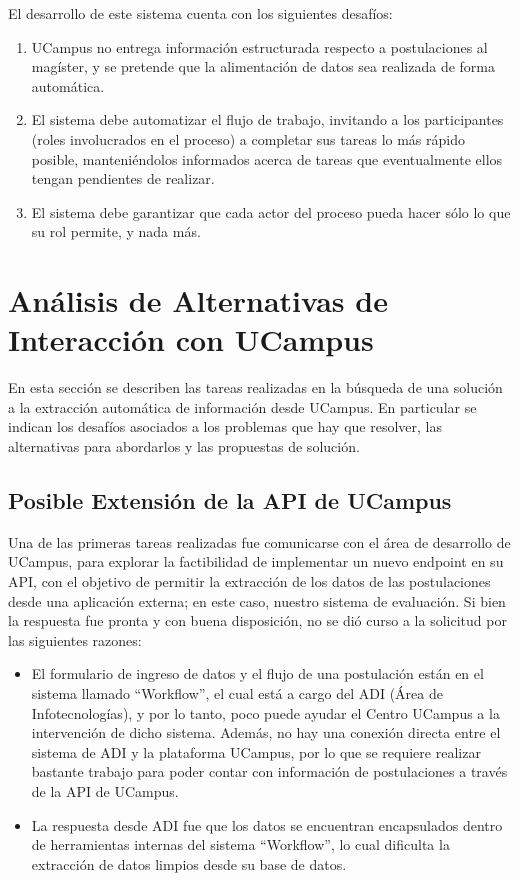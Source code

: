 El desarrollo de este sistema cuenta con los siguientes desafíos:

\begin{enumerate}
    \item UCampus no entrega información estructurada respecto a postulaciones
    al magíster, y se pretende que la alimentación de datos sea realizada de
    forma automática.
    \item El sistema debe automatizar el flujo de trabajo, invitando a los
    participantes (roles involucrados en el proceso) a completar sus tareas lo
    más rápido posible, manteniéndolos informados acerca de tareas que
    eventualmente ellos tengan pendientes de realizar.
    \item El sistema debe garantizar que cada actor del proceso pueda hacer sólo
    lo que su rol permite, y nada más.
\end{enumerate}


\section{Análisis de Alternativas de Interacción con UCampus}

En esta sección se describen las tareas realizadas en la búsqueda de una
solución a la extracción automática de información desde UCampus. En particular
se indican los desafíos asociados a los problemas que hay que resolver, las
alternativas para abordarlos y las propuestas de solución.

\subsection{Posible Extensión de la API de UCampus}

Una de las primeras tareas realizadas fue comunicarse con el área de desarrollo
de UCampus, para explorar la factibilidad de implementar un nuevo endpoint en su
API, con el objetivo de permitir la extracción de los datos de las postulaciones
desde una aplicación externa; en este caso, nuestro sistema de evaluación. Si
bien la respuesta fue pronta y con buena disposición, no se dió curso a la
solicitud por las siguientes razones:

\begin{itemize}
    \item El formulario de ingreso de datos y el flujo de una postulación están en
    el sistema llamado ``Workflow'', el cual está a cargo del ADI (Área de
    Infotecnologías), y por lo tanto, poco puede ayudar el Centro UCampus a la
    intervención de dicho sistema. Además, no hay una conexión directa entre el
    sistema de ADI y la plataforma UCampus, por lo que se requiere realizar bastante
    trabajo para poder contar con información de postulaciones a través de la API de
    UCampus.
    \item La respuesta desde ADI fue que los datos se encuentran encapsulados dentro
    de herramientas internas del sistema ``Workflow'', lo cual dificulta la extracción
    de datos limpios desde su base de datos.
\end{itemize}

